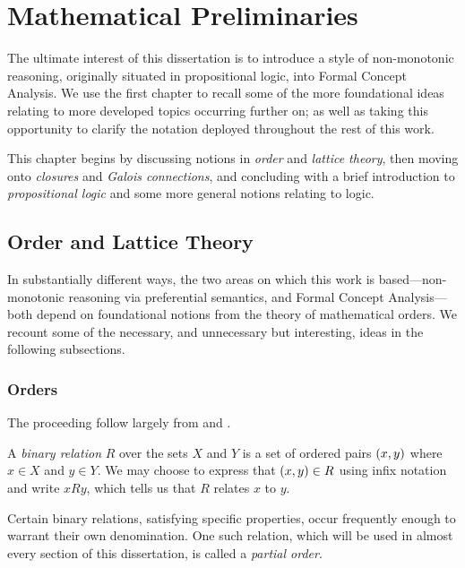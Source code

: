 \chapter{Mathematical Preliminaries}
\label{chapter:mathematical-preliminaries}

The ultimate interest of this dissertation is to introduce a style of non-monotonic reasoning, originally situated in propositional
logic, into Formal Concept Analysis. We use the first chapter to recall some of the more foundational ideas relating to more
developed topics occurring further on; as well as taking this opportunity to clarify the notation deployed throughout
the rest of this work.

This chapter begins by discussing notions in \textit{order} and \textit{lattice theory}, then moving onto \textit{closures}
and \textit{Galois connections}, and concluding with a brief introduction to \textit{propositional logic} and some more general
notions relating to logic.

\section{Order and Lattice Theory}
\label{section:order-theory}

In substantially different ways, the two areas on which this work is based---non-monotonic reasoning via preferential semantics,
and Formal Concept Analysis---both depend on foundational notions from the theory of mathematical orders. We recount some
of the necessary, and unnecessary but interesting, ideas in the following subsections.

\subsection{Orders}
\label{subsection:orders}

The proceeding follow largely from \cite{davey2002introduction} and \cite{bergman2015invitation}.

A \textit{binary relation}  $R$ over the sets $X$ and $Y$ is a set of ordered pairs $(x,y)$ where
$x \in X$ and $y \in Y$. We may choose to express that $(x,y)\in R$ using infix notation and write $xRy$, which tells
us that $R$ relates $x$ to $y$.

Certain binary relations, satisfying specific properties, occur frequently enough to warrant their own denomination. One
such relation, which will be used in almost every section of this dissertation, is called a \textit{partial order}.

